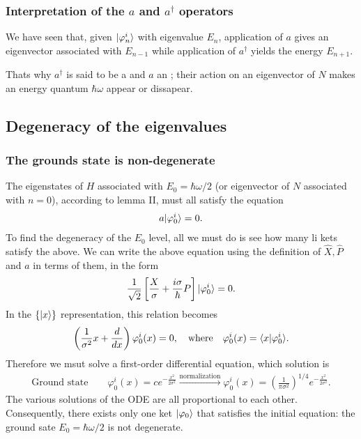 \subsubsection{Interpretation of the $a$ and $a^\dagger$ operators}
We have seen that, given $|\varphi_n^i\rangle$ with eigenvalue $E_n$, application of $a$ gives an eigenvector associated with $E_{n-1}$ while 
application of $a^\dagger$ yields the energy $E_{n+1}$.

Thats why $a^\dagger$ is said to be a  and $a$ an ; their action on an eigenvector of $N$ makes 
an energy quantum $\hbar\omega$ appear or dissapear.

\subsection{Degeneracy of the eigenvalues}
%
\subsubsection{The grounds state is non-degenerate}
The eigenstates of $H$ associated with $E_0=\hbar\omega/2$ (or eigenvector of $N$ associated with $n=0$), according to lemma II,
must all satisfy the equation
\begin{align*}
    a|\varphi_0^i\rangle=0.
\end{align*}
To find the degeneracy of the $E_0$ level, all we must do is see how many li kets satisfy the above.
We can write the above equation using the definition of $\hat{X},\hat{P}$ and $a$ in terms of them, in the form 
\begin{align*}
    \frac{1}{\sqrt{2}}\left[\frac{X}{\sigma}+\frac{i\sigma}{\hbar}P\right]|\varphi_0^i\rangle=0.
\end{align*}
In the $\{|x\rangle\}$ representation, this relation becomes
\begin{align*}
    \left(\frac{1}{\sigma^2}x+\frac{d}{dx}\right)\varphi_0^i(x)=0,\quad\text{where}\quad\varphi_0^i(x)=\langle x|\varphi_0^i\rangle.
\end{align*}
Therefore we msut solve a first-order differential equation, which solution is 
\begin{align}
    \text{Ground state}\qquad\varphi_0^i(x)=ce^{-\frac{x^2}{2\sigma^2}}\stackrel{\text{normalization}}{\longrightarrow}\varphi_0^i(x)=\left(\frac{1}{\pi\sigma^2}\right)^{1/4}e^{-\frac{x^2}{2\sigma^2}}.
\end{align}
The various solutions of the ODE are all proportional to each other. Consequently, there exists only one ket $|\varphi_0\rangle$ that satisfies 
the initial equation: the ground sate $E_0=\hbar\omega/2$ is not degenerate.
%
